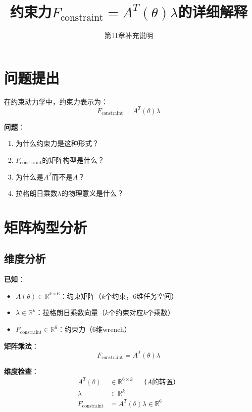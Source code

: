 \documentclass[12pt,a4paper]{article}
\title{约束力$F_{\text{constraint}} = A^T(\theta)\lambda$的详细解释}
\author{第11章补充说明}
\date{}
\begin{document}
\maketitle

\section{问题提出}

在约束动力学中，约束力表示为：
\begin{equation}
F_{\text{constraint}} = A^T(\theta)\lambda
\end{equation}

\textbf{问题}：
\begin{enumerate}
\item 为什么约束力是这种形式？
\item $F_{\text{constraint}}$的矩阵构型是什么？
\item 为什么是$A^T$而不是$A$？
\item 拉格朗日乘数$\lambda$的物理意义是什么？
\end{enumerate}

\section{矩阵构型分析}

\subsection{维度分析}

\textbf{已知}：
\begin{itemize}
\item $A(\theta) \in \mathbb{R}^{k \times 6}$：约束矩阵（$k$个约束，6维任务空间）
\item $\lambda \in \mathbb{R}^k$：拉格朗日乘数向量（$k$个约束对应$k$个乘数）
\item $F_{\text{constraint}} \in \mathbb{R}^6$：约束力（6维wrench）
\end{itemize}

\textbf{矩阵乘法}：
\begin{equation}
F_{\text{constraint}} = A^T(\theta)\lambda
\end{equation}

\textbf{维度检查}：
\begin{align}
A^T(\theta) &\in \mathbb{R}^{6 \times k} \quad \text{（$A$的转置）} \\
\lambda &\in \mathbb{R}^k \\
F_{\text{constraint}} &= A^T(\theta)\lambda \in \mathbb{R}^6
\end{align}
\end{document}
